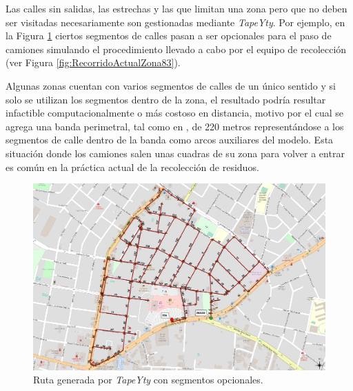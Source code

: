 Las calles sin salidas, las estrechas y las que limitan una zona pero que no deben ser visitadas necesariamente son gestionadas mediante \textit{TapeYty}. Por ejemplo, en la Figura \ref{fig:RecorridoTapeYtyZona83Opcionales} ciertos segmentos de calles pasan a ser opcionales para el paso de camiones simulando el procedimiento llevado a cabo por el equipo de recolección (ver Figura \ref{fig:RecorridoActualZona83}).


Algunas zonas cuentan con varios segmentos de calles de un único sentido y si solo se utilizan los segmentos dentro de la zona, el resultado podría resultar infactible computacionalmente o más costoso en distancia, motivo por el cual se agrega una banda perimetral, tal como en \citet{Braier2017AnArgentina}, de 220 metros representándose a los segmentos de calle dentro de la banda como arcos auxiliares del modelo. Esta situación donde los camiones salen unas cuadras de su zona para volver a entrar es común en la práctica actual de la recolección de residuos.

\begin{figure}[htbp]
    \centering
    \includegraphics[width=\textwidth]{recorrido83Opcionales.png}
    \caption{Ruta generada por \textit{TapeYty} con segmentos opcionales.}
    \label{fig:RecorridoTapeYtyZona83Opcionales}
\end{figure}


